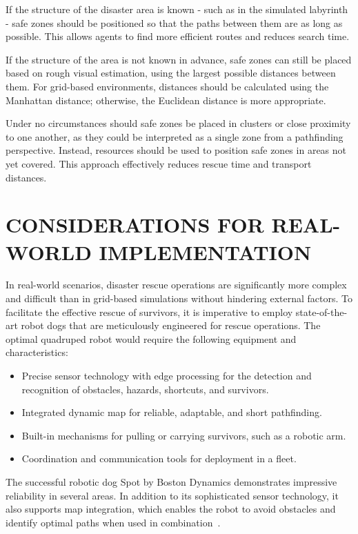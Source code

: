 \documentclass[a4paper,twoside]{article}
\begin{document}
If the structure of the disaster area is known - such as in the simulated labyrinth  - safe zones should be positioned so that the paths between them are as long as possible. 
This allows agents to find more efficient routes and reduces search time.

If the structure of the area is not known in advance, safe zones can still be placed based on rough visual estimation, using the largest possible distances between them. 
For grid-based environments, distances should be calculated using the Manhattan distance; otherwise, the Euclidean distance is more appropriate.

Under no circumstances should safe zones be placed in clusters or close proximity to one another, as they could be interpreted as a single zone from a pathfinding perspective.
Instead, resources should be used to position safe zones in areas not yet covered. 
This approach effectively reduces rescue time and transport distances.


\section{\uppercase{Considerations for Real-World Implementation}}
\label{sec:real_world_example}

In real-world scenarios, disaster rescue operations are significantly more complex and difficult than in grid-based simulations without hindering external factors.
To facilitate the effective rescue of survivors, it is imperative to employ state-of-the-art robot dogs that are meticulously engineered for rescue operations.
The optimal quadruped robot would require the following equipment and characteristics:

\begin{itemize}
    \item Precise sensor technology with edge processing for the detection and recognition of obstacles, hazards, shortcuts, and survivors.
    \item Integrated dynamic map for reliable, adaptable, and short pathfinding.
    \item Built-in mechanisms for pulling or carrying survivors, such as a robotic arm.
    \item Coordination and communication tools for deployment in a fleet.
\end{itemize}

The successful robotic dog Spot by Boston Dynamics demonstrates impressive reliability in several areas. 
In addition to its sophisticated sensor technology, it also supports map integration, which enables the robot to avoid obstacles and identify optimal paths when used in combination\ \cite{boston_dynamics_2025_navigation,koval2022navigation}.
\end{document}
